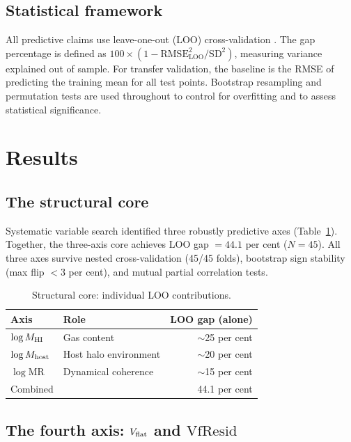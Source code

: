 \documentclass[fleqn,usenatbib]{mnras}
\newcommand{\vflat}{V_{\rm flat}}
\newcommand{\vfresid}{\mathrm{VfResid}}
\newcommand{\mhi}{M_{\rm HI}}
\newcommand{\mhost}{M_{\rm host}}
\newcommand{\loo}{\mathrm{LOO}}
\begin{document}
\subsection{Statistical framework}
\label{sec:stats}

All predictive claims use leave-one-out (LOO) cross-validation
\citep{Stone1974}. The gap percentage is defined as
$100 \times (1 - \mathrm{RMSE}_{\loo}^2 / \mathrm{SD}^2)$, measuring
variance explained out of sample. For transfer validation, the baseline is
the RMSE of predicting the training mean for all test points. Bootstrap
resampling \citep[$10\,000$ iterations;][]{Efron1979} and permutation tests
are used throughout to control for overfitting and to assess statistical
significance.

\section{Results}
\label{sec:results}

\subsection{The structural core}
\label{sec:core}

Systematic variable search identified three robustly predictive axes
(Table~\ref{tab:core}). Together, the three-axis core achieves
$\loo$ gap $= 44.1$ per cent ($N=45$). All three axes survive nested
cross-validation (45/45 folds), bootstrap sign stability (max flip
$< 3$ per cent), and mutual partial correlation tests.

\begin{table}
\centering
\caption{Structural core: individual LOO contributions.}
\label{tab:core}
\begin{tabular}{@{}llr@{}}
\hline
Axis & Role & LOO gap (alone) \\
\hline
$\log \mhi$ & Gas content & $\sim$25 per cent \\
$\log \mhost$ & Host halo environment & $\sim$20 per cent \\
$\log$MR & Dynamical coherence & $\sim$15 per cent \\
\hline
Combined & & 44.1 per cent \\
\hline
\end{tabular}
\end{table}

\subsection{The fourth axis: $\vflat$ and $\vfresid$}
\label{sec:vfresid}
\end{document}
